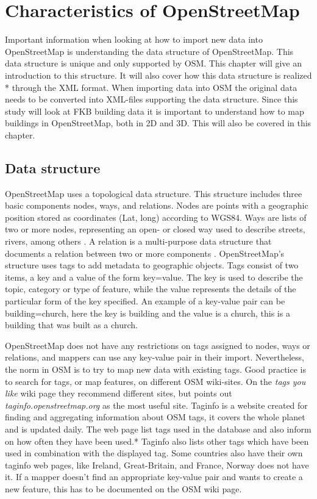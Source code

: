 \chapter{Characteristics of OpenStreetMap}


Important information when looking at how to import new data into OpenStreetMap is understanding the data structure of OpenStreetMap. This data structure is unique and only supported by OSM. This chapter will give an introduction to this structure. It will also cover how this data structure is realized *%
through the XML format. When importing data into OSM the original data needs to be converted into XML-files supporting the data structure. Since this study will look at FKB building data it is important to understand how to map buildings in OpenStreetMap, both in 2D and 3D. This will also be covered in this chapter. 

\section{Data structure}
OpenStreetMap uses a topological data structure. This structure includes three basic components nodes, ways, and relations. Nodes are points with a geographic position stored as coordinates (Lat, long) according to WGS84. Ways are lists of two or more nodes, representing an open- or closed way used to describe streets, rivers, among others \cite{Debruyne2015}. A relation is a multi-purpose data structure that documents a relation between two or more components \cite{OpenStreetMapg}. OpenStreetMap's structure uses tags to add metadata to geographic objects. Tags consist of two items, a key and a value of the form key=value. The key is used to describe the topic, category or type of feature, while the value represents the details of the particular form of the key specified. An example of a key-value pair can be building=church, here the key is building and the value is a church, this is a building that was built as a church. 

OpenStreetMap does not have any restrictions on tags assigned to nodes, ways or relations, and mappers can use any key-value pair in their import. Nevertheless, the norm in OSM is to try to map new data with existing tags. Good practice is to search for tags, or map features, on different OSM wiki-sites. On the \textit{tags you like} wiki page they recommend different sites, but points out \textit{taginfo.openstreetmap.org} as the most useful site. Taginfo is a website created for finding and aggregating information about OSM tags, it covers the whole planet and is updated daily. The web page list tags used in the database and also inform on how often they have been used.* %
 Taginfo also lists other tags which have been used in combination with the displayed tag. Some countries also have their own taginfo web pages, like Ireland, Great-Britain, and France, Norway does not have it. If a mapper doesn't find an appropriate key-value pair and wants to create a new feature, this has to be documented on the OSM wiki page. 

